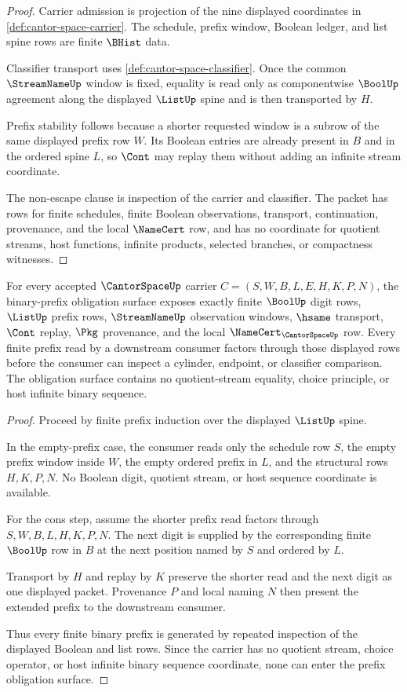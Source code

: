 \begin{proof}
Carrier admission is projection of the nine displayed coordinates in
\autoref{def:cantor-space-carrier}. The schedule, prefix window, Boolean
ledger, and list spine rows are finite $\BHist$ data.

Classifier transport uses \autoref{def:cantor-space-classifier}. Once the
common $\StreamNameUp$ window is fixed, equality is read only as
componentwise $\BoolUp$ agreement along the displayed $\ListUp$ spine and is
then transported by $H$.

Prefix stability follows because a shorter requested window is a subrow of the
same displayed prefix row $W$. Its Boolean entries are already present in $B$
and in the ordered spine $L$, so $\Cont$ may replay them without adding an
infinite stream coordinate.

The non-escape clause is inspection of the carrier and classifier. The packet
has rows for finite schedules, finite Boolean observations, transport,
continuation, provenance, and the local $\NameCert$ row, and has no coordinate
for quotient streams, host functions, infinite products, selected branches, or
compactness witnesses.
\end{proof}

\begin{theorem}
\label{thm:cantorspace-binary-prefix-obligations}
For every accepted $\CantorSpaceUp$ carrier $C=(S,W,B,L,E,H,K,P,N)$, the binary-prefix obligation surface exposes exactly finite $\BoolUp$ digit rows, $\ListUp$ prefix rows, $\StreamNameUp$ observation windows, $\hsame$ transport, $\Cont$ replay, $\Pkg$ provenance, and the local $\NameCert_{\CantorSpaceUp}$ row. Every finite prefix read by a downstream consumer factors through those displayed rows before the consumer can inspect a cylinder, endpoint, or classifier comparison. The obligation surface contains no quotient-stream equality, choice principle, or host infinite binary sequence.
\end{theorem}
\begin{proof}
Proceed by finite prefix induction over the displayed $\ListUp$ spine.

In the empty-prefix case, the consumer reads only the schedule row $S$, the empty prefix window inside $W$, the empty ordered prefix in $L$, and the structural rows $H,K,P,N$. No Boolean digit, quotient stream, or host sequence coordinate is available.

For the cons step, assume the shorter prefix read factors through $S,W,B,L,H,K,P,N$. The next digit is supplied by the corresponding finite $\BoolUp$ row in $B$ at the next position named by $S$ and ordered by $L$.

Transport by $H$ and replay by $K$ preserve the shorter read and the next digit as one displayed packet. Provenance $P$ and local naming $N$ then present the extended prefix to the downstream consumer.

Thus every finite binary prefix is generated by repeated inspection of the displayed Boolean and list rows. Since the carrier has no quotient stream, choice operator, or host infinite binary sequence coordinate, none can enter the prefix obligation surface.
\end{proof}

